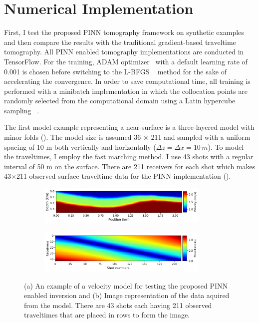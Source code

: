 \section{Numerical Implementation}
\label{sec:numerical_imp}

First, I test the proposed PINN tomography framework on synthetic examples and then compare the results with the traditional gradient-based traveltime tomography. All PINN enabled tomography implementations are conducted in TensorFlow. For the training, ADAM optimizer~\cite{kb:14} with a default learning rate of 0.001 is chosen before switching to the L-BFGS ~\cite{ln:89} method for the sake of accelerating the convergence. In order to save computational time, all training is performed with a minibatch implementation in which the collocation points are randomly selected from the computational domain using a Latin hypercube sampling ~\cite{s:87}.

The first model example representing a near-surface is a three-layered model with minor folds (). The model size is assumed 36 $\times$ 211 and sampled with a uniform spacing of 10 m both vertically and horizontally ($\Delta z = \Delta x = 10 \, m$). To model the traveltimes, I employ the fast marching method. I use 43 shots with a regular interval of 50 m on the surface.  There are 211 receivers for each shot which makes 43$\times$211 observed surface traveltime data for the PINN implementation ().

 
\begin{figure}
       \centering
       \begin{subfigure}[b]{.9\textwidth}
               \centering
               \includegraphics[width=0.9\textwidth]{figures/chap03_pinn_enabled/folded_model} 
               \caption{}
               \label{fig:folded_model}
       \end{subfigure}
       \begin{subfigure}[b]{.9\textwidth}
               \centering
               \includegraphics[width=0.9\textwidth]{figures/chap03_pinn_enabled/folded_data}
               \caption{}
               \label{fig:folded_data}
       \end{subfigure}
       \caption{(a) An example of a velocity model for testing the proposed PINN enabled inversion and (b) Image representation of the data aquired from the model. There are 43 shots each having 211 observed traveltimes that are placed in rows to form the image.  }
       \label{fig:folded_example}
\end{figure}


